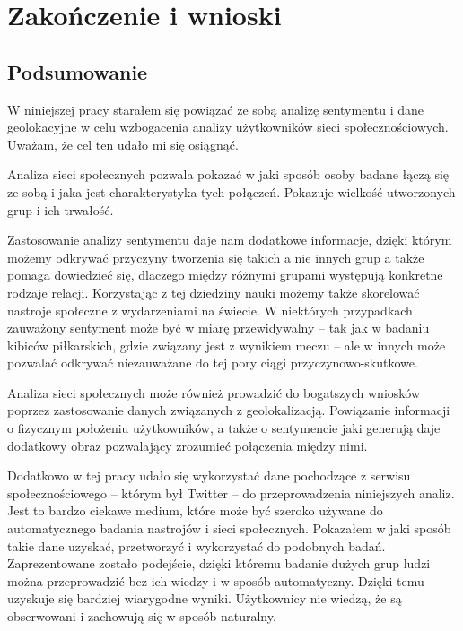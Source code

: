 \chapter{Zakończenie i wnioski}
\section{Podsumowanie}

W niniejszej pracy starałem się powiązać ze sobą analizę sentymentu i dane
geolokacyjne w celu wzbogacenia analizy użytkowników sieci społecznościowych.
Uważam, że cel ten udało mi się osiągnąć.

Analiza sieci społecznych pozwala pokazać w jaki sposób osoby badane łączą się
ze sobą i jaka jest charakterystyka tych połączeń. Pokazuje wielkość
utworzonych grup i ich trwałość.

Zastosowanie analizy sentymentu daje nam dodatkowe informacje, dzięki którym
możemy odkrywać przyczyny tworzenia się takich a nie innych grup
a także pomaga dowiedzieć się, dlaczego między różnymi grupami występują
konkretne rodzaje relacji. Korzystając z tej dziedziny nauki możemy także
skorelować nastroje społeczne z wydarzeniami na świecie. W niektórych przypadkach
zauważony sentyment może być w miarę przewidywalny -- tak jak w badaniu 
kibiców piłkarskich, gdzie związany jest z wynikiem meczu -- ale w innych
może pozwalać odkrywać niezauważane do tej pory ciągi przyczynowo-skutkowe.

Analiza sieci społecznych może również prowadzić do bogatszych wniosków
poprzez zastosowanie danych związanych z geolokalizacją. Powiązanie informacji
o fizycznym położeniu użytkowników, a także o sentymencie jaki generują
daje dodatkowy obraz pozwalający zrozumieć połączenia między nimi.

Dodatkowo w tej pracy udało się wykorzystać dane pochodzące z serwisu 
społecznościowego -- którym był Twitter -- do przeprowadzenia niniejszych
analiz.
Jest to bardzo ciekawe medium, które może być szeroko używane do automatycznego
badania nastrojów i sieci społecznych. Pokazałem w jaki sposób takie dane uzyskać,
przetworzyć i wykorzystać do podobnych badań. Zaprezentowane zostało podejście,
dzięki któremu badanie dużych grup ludzi można przeprowadzić bez ich wiedzy
i w sposób automatyczny. Dzięki temu uzyskuje się bardziej wiarygodne wyniki.
Użytkownicy nie wiedzą, że są obserwowani i zachowują się w sposób naturalny.


